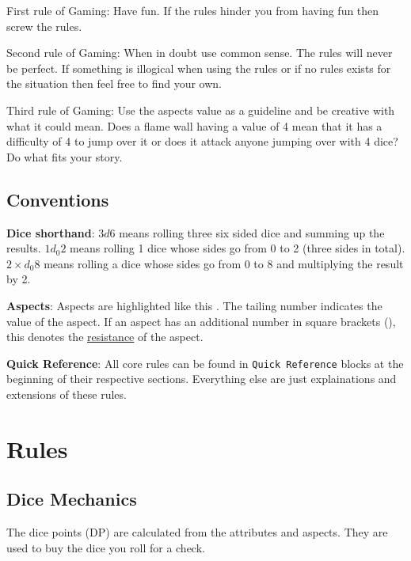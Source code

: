 \documentclass[11pt]{article}
\begin{document}
{First rule of Gaming: Have fun. If the rules hinder you from having fun then screw the rules.

Second rule of Gaming: When in doubt use common sense. The rules will never be perfect. If something is illogical when using the rules or if no rules exists for the situation then feel free to find your own. 

Third rule of Gaming: Use the aspects value as a guideline and be creative with what it could mean. Does a flame wall having a value of 4 mean that it has a difficulty of 4 to jump over it or does it attack anyone jumping over with 4 dice? Do what fits your story. 
\subsection{Conventions}
\label{sec:org893852d}
\textbf{Dice shorthand}: \(3 d 6\) means rolling three six sided dice and summing up the results. \(1 d_0 2\) means rolling 1 dice whose sides go from 0 to 2 (three sides in total). \(2 \times d_0 8\) means rolling a dice whose sides go from 0 to 8 and multiplying the result by 2.

\textbf{Aspects}: Aspects are highlighted like this . The tailing number indicates the value of the aspect. If an aspect has an additional number in square brackets (), this denotes the \hyperref[sec:org674d41e]{resistance} of the aspect. 

\textbf{Quick Reference}: All core rules can be found in \texttt{Quick Reference} blocks at the beginning of their respective sections. Everything else are just explainations and extensions of these rules.
\section{Rules}
\label{sec:org112b32c}

\subsection{Dice Mechanics}
\label{sec:org4a0f369}
\begin{short}
The dice points (DP) are calculated from the attributes and aspects. They are used to buy the dice you roll for a check.


\end{short}}
\end{document}
